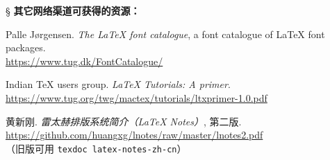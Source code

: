 \begin{thebibliography}{20}
\item[\S] {\bfseries 其它网络渠道可获得的资源：}

 Palle J{\o}rgensen.
  \newblock \emph{The \LaTeX{} font catalogue}, a font catalogue of \LaTeX{} font packages.\\
  \url{https://www.tug.dk/FontCatalogue/}

 Indian \TeX{} users group.
  \newblock \emph{\LaTeX{} Tutorials: A primer}. \\
  \url{https://www.tug.org/twg/mactex/tutorials/ltxprimer-1.0.pdf}

 黄新刚.
  \newblock \emph{雷太赫排版系统简介（\LaTeX{} Notes）}, 第二版. \\
  \url{https://github.com/huangxg/lnotes/raw/master/lnotes2.pdf} \\
  （旧版可用 \texttt{texdoc latex-notes-zh-cn}）

\end{thebibliography}

\endinput
